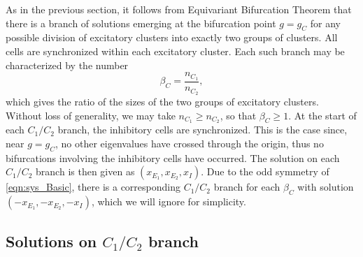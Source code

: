 \documentclass[reqno]{siamonline190516}
\begin{document}
As in the previous section, it follows from Equivariant Bifurcation Theorem that there is a branch of solutions emerging at the bifurcation point $g = g_C$ for any possible division of excitatory clusters into exactly two groups of clusters. All cells are synchronized within each excitatory cluster. Each such branch may be characterized by the number 
\begin{equation}\label{eq:betac}
\beta_C = \frac{n_{C_1}}{n_{C_2}},
\end{equation}
which gives the ratio of the sizes of the two groups of excitatory clusters. Without loss of generality, we may take $n_{C_1} \geq n_{C_2}$, so that $\beta_C \geq 1$. At the start of each $C_1/C_2$ branch, the inhibitory cells are synchronized. This is the case since, near $g = g_C$, no other eigenvalues have crossed through the origin, thus no bifurcations involving the inhibitory cells have occurred. The solution on each $C_1/C_2$ branch is then given as $(x_{E_1}, x_{E_2}, x_{I})$. Due to the odd symmetry of \cref{eqn:sys_Basic}, there is a corresponding $C_1/C_2$ branch for each $\beta_C$ with solution $(-x_{E_1}, -x_{E_2}, -x_{I})$, which we will ignore for simplicity.

\subsection{Solutions on \texorpdfstring{$C_1/C_2$}{C1/C2} branch}
\end{document}
